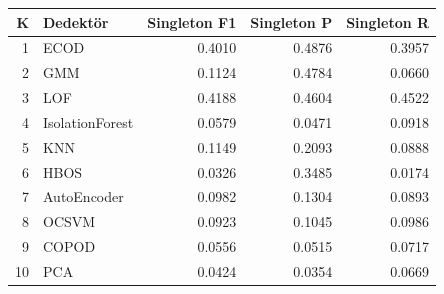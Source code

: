 \begin{tabular}{rlrrr}
\toprule
K & Dedektör & Singleton F1 & Singleton P & Singleton R \\
\midrule
1 & ECOD & 0.4010 & 0.4876 & 0.3957 \\
2 & GMM & 0.1124 & 0.4784 & 0.0660 \\
3 & LOF & 0.4188 & 0.4604 & 0.4522 \\
4 & IsolationForest & 0.0579 & 0.0471 & 0.0918 \\
5 & KNN & 0.1149 & 0.2093 & 0.0888 \\
6 & HBOS & 0.0326 & 0.3485 & 0.0174 \\
7 & AutoEncoder & 0.0982 & 0.1304 & 0.0893 \\
8 & OCSVM & 0.0923 & 0.1045 & 0.0986 \\
9 & COPOD & 0.0556 & 0.0515 & 0.0717 \\
10 & PCA & 0.0424 & 0.0354 & 0.0669 \\
\bottomrule
\end{tabular}

